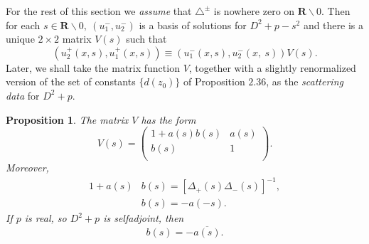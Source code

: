 \documentclass{surv-l}
\theoremstyle{plain}
\newtheorem{prop}[theorem]{Proposition}
\theoremstyle{definition}
\numberwithin{equation}{chapter}
\begin{document}
For the rest of this section we \emph{assume} that $\triangle^{\pm}$ is nowhere zero on $\mathbf{R}\backslash 0$. Then for each $s\in \mathbf{R}\backslash 0,\ (u_{1}^{-}, u_{2}^{-})$ is a basis of solutions for $D^{2}+p-s^{2}$ and there is a unique $2\times 2$ matrix $V(s)$ such that
\setcounter{equation}{36}
\begin{equation}\label{eq2.37}
(u_{2}^{+}(x, s), u_{1}^{+}(x, s))\equiv(u_{1}^{-}(x, s), u_{2}^{-}(x,\ s))V(s).
\end{equation}
Later, we shall take the matrix function $V$, together with a slightly renormalized version of the set of constants $\{d(z_{0})\}$ of Proposition $2.36$, as the \emph{scattering data} for $D^{2}+p$.
\setcounter{theorem}{37}
\begin{prop}\label{chap01:prop2.38}
The matrix $V$  has the form
\setcounter{equation}{38}
\begin{equation}\label{eq2.39}
V(s)=\left(
  \begin{array}{cc}
    1+a(s)b(s) & a(s) \\
    b(s) & 1 \\
  \end{array}
\right).
\end{equation}
Moreover,
\begin{align}\label{eq2.40}
1+a(s)&b(s)=[\Delta_{+}(s)\Delta_{-}(s)]^{-1},\\
&b(s)=-a(-s).\label{eq2.41}
\end{align}
If $p$ is real, so $D^{2}+p$ is selfadjoint, then
\begin{equation}\label{eq2.42}
b(s)=-\overline{a(s)}.
\end{equation}
\end{prop}
\end{document}
